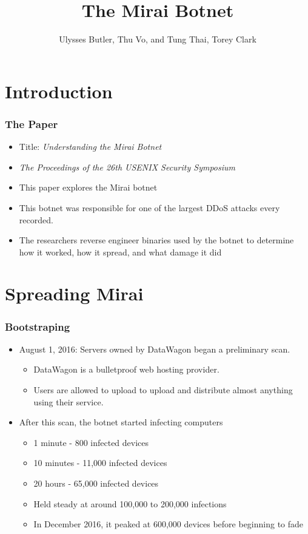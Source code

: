 \documentclass{beamer}
\title{The Mirai Botnet}
\author{Ulysses Butler, Thu Vo, and Tung Thai, Torey Clark}
\institute{ Truman State University \\ Binary Beasts }
\date{}
\begin{document}
\maketitle

\section{Introduction}

\begin{frame}
	\frametitle{The Paper}
	\begin{itemize}
		\item<+-> Title: \textit{Understanding the Mirai Botnet}
		\item<+-> \textit{The Proceedings of the 26th USENIX Security Symposium}
		\item<+-> This paper explores the Mirai botnet
		\item<+-> This botnet was responsible for one of the largest DDoS attacks every recorded.
		\item<+-> The researchers reverse engineer binaries used by the botnet to determine how it worked, how it spread, and what damage it did
	\end{itemize}
\end{frame}

\section{Spreading Mirai}

\begin{frame}
	\frametitle{Bootstraping}
	\begin{itemize}
		\item<+-> August 1, 2016: Servers owned by DataWagon began a preliminary scan.
		\begin{itemize}
			\item<+-> DataWagon is a bulletproof web hosting provider.
			\item<+-> Users are allowed to upload to upload and distribute almost anything using their service.
		\end{itemize}
		\item<+-> After this scan, the botnet started infecting computers
		\begin{itemize}
			\item<+-> 1 minute -  800 infected devices
			\item<+-> 10 minutes - 11,000 infected devices
			\item<+-> 20 hours - 65,000 infected devices
			\item<+-> Held steady at around 100,000 to 200,000 infections
			\item<+-> In December 2016, it peaked at 600,000 devices before beginning to fade
		\end{itemize}
	\end{itemize}
\end{frame}
\end{document}
